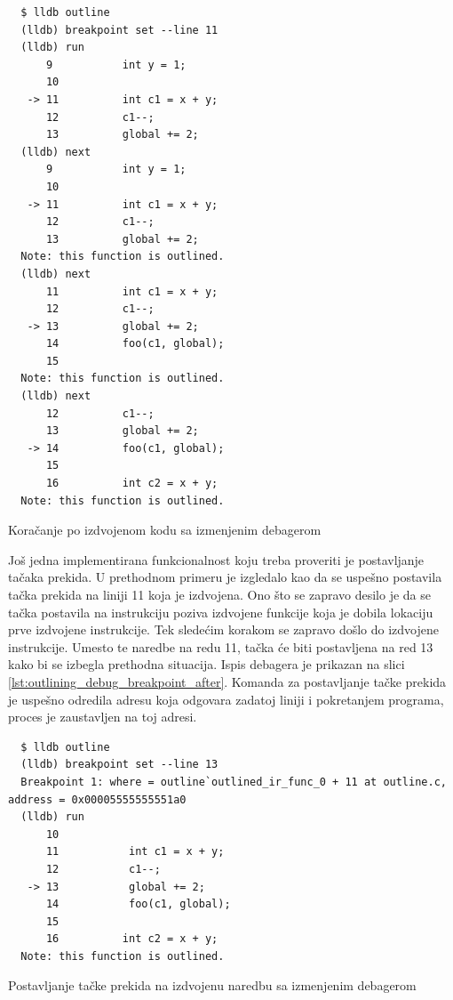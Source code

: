 \documentclass[12pt,oneside]{memoir}
\begin{document}
\begin{listing}[!ht]
\begin{verbatim}
  $ lldb outline
  (lldb) breakpoint set --line 11
  (lldb) run
      9           int y = 1;
      10          
   -> 11          int c1 = x + y;
      12          c1--;
      13          global += 2;
  (lldb) next
      9           int y = 1;
      10          
   -> 11          int c1 = x + y;
      12          c1--;
      13          global += 2;
  Note: this function is outlined.
  (lldb) next
      11          int c1 = x + y;
      12          c1--;
   -> 13          global += 2;
      14          foo(c1, global);
      15          
  Note: this function is outlined.
  (lldb) next
      12          c1--;
      13          global += 2;
   -> 14          foo(c1, global);
      15          
      16          int c2 = x + y;
  Note: this function is outlined.
\end{verbatim}
\caption{Koračanje po izdvojenom kodu sa izmenjenim debagerom}
\label{lst:outlining_debug_step_after}
\end{listing}

Još jedna implementirana funkcionalnost koju treba proveriti je postavljanje tačaka prekida.
U prethodnom primeru je izgledalo kao da se uspešno postavila tačka prekida na liniji 11 koja je izdvojena.
Ono što se zapravo desilo je da se tačka postavila na instrukciju poziva izdvojene funkcije koja je dobila lokaciju prve izdvojene instrukcije.
Tek sledećim korakom se zapravo došlo do izdvojene instrukcije.
Umesto te naredbe na redu 11, tačka će biti postavljena na red 13 kako bi se izbegla prethodna situacija.
Ispis debagera je prikazan na slici \ref{lst:outlining_debug_breakpoint_after}.
Komanda za postavljanje tačke prekida je uspešno odredila adresu koja odgovara zadatoj liniji i pokretanjem programa, proces je zaustavljen na toj adresi.

\begin{listing}[!ht]
\begin{verbatim}
  $ lldb outline
  (lldb) breakpoint set --line 13
  Breakpoint 1: where = outline`outlined_ir_func_0 + 11 at outline.c, address = 0x00005555555551a0
  (lldb) run
      10          
      11  	       int c1 = x + y;
      12  	       c1--;
   -> 13  	       global += 2;
      14  	       foo(c1, global);
      15          
      16          int c2 = x + y;
  Note: this function is outlined.
\end{verbatim}
\caption{Postavljanje tačke prekida na izdvojenu naredbu sa izmenjenim debagerom}
\label{lst:outlining_debug_breakpoint_after}
\end{listing}
\end{document}

